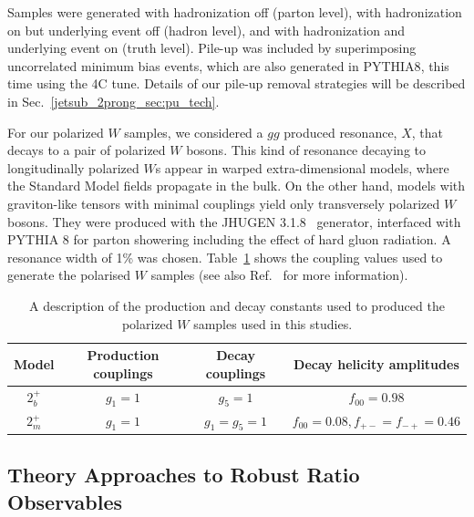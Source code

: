 \documentclass[11pt]{cernrep}
\begin{document}
%
Samples were generated with hadronization off (parton level), with
hadronization on but underlying event off (hadron level), and with
hadronization and underlying event on (truth level). Pile-up was
included by superimposing uncorrelated minimum bias events, which are
also generated in \textsc{PYTHIA8}, this time using the 4C
tune. Details of our pile-up removal strategies will be described in
Sec.~\ref{jetsub_2prong_sec:pu_tech}.

For our polarized $W$ samples, we considered a $gg$ produced resonance, $X$, that decays to a pair of polarized $W$ bosons.
%
This kind of resonance decaying to longitudinally polarized $W$s appear in warped extra-dimensional models, where the Standard Model fields propagate in the bulk.
%
On the other hand, models with graviton-like tensors with minimal couplings yield only transversely polarized $W$ bosons.
%
They were produced with the \textsc{JHUGEN} 3.1.8~\cite{Gao:2010qx,Bolognesi:2012mm} generator, interfaced with \textsc{PYTHIA} 8 \cite{Sjostrand:2007gs} for parton showering including the effect of hard gluon radiation.
A resonance width of 1\% was chosen.
%
Table~\ref{jetsub_2prong_table:polarisedSamples} shows the coupling values used to generate the polarised $W$ samples (see also Ref.~\cite{Gao:2010qx} for more information). 

\begin{table}[t]
\centering
\begin{tabular}{|c|c|c|c|}
\hline
Model	&Production couplings	&Decay couplings	&Decay helicity amplitudes 	\\
\hline
$2_b^+$	& $g_1=1$		& $g_5=1$		& $f_{00}=0.98$			\\
$2_m^+$	& $g_1=1$		& $g_1=g_5=1$		& $f_{00}=0.08,f_{+-}=f_{-+}=0.46$\\	
\hline
\end{tabular}
\caption{A description of the production and decay constants used to produced the polarized $W$ samples used in this studies.}
\label{jetsub_2prong_table:polarisedSamples}
\end{table}



\subsection{Theory Approaches to Robust Ratio Observables}\label{jetsub_2prong_sec:hybrid_ratio}
\end{document}
